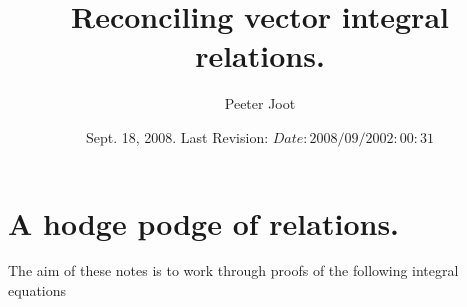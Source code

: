 \documentclass{article}
\title{ Reconciling vector integral relations. }
\author{Peeter Joot}
\date{ Sept. 18, 2008.  Last Revision: $Date: 2008/09/20 02:00:31 $ }
\begin{document}
\maketitle{}

\tableofcontents

\section{ A hodge podge of relations. }


The aim of these notes is to work through proofs of the following 
integral equations
\end{document}
